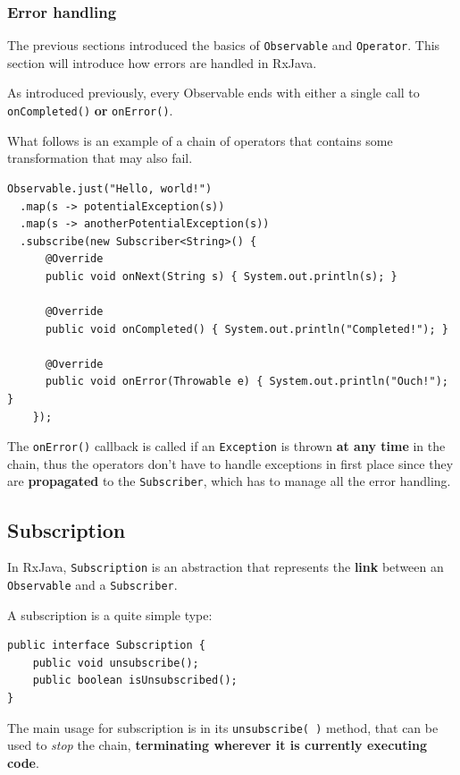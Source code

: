 \subsubsection{Error handling}\label{error-handling}

The previous sections introduced the basics of \texttt{Observable} and
\texttt{Operator}. This section will introduce how errors are handled in
RxJava.

As introduced previously, every Observable ends with either a single
call to \texttt{onCompleted()} \textbf{or} \texttt{onError()}.

What follows is an example of a chain of operators that contains some
transformation that may also fail.

\begin{verbatim}
Observable.just("Hello, world!")
  .map(s -> potentialException(s))
  .map(s -> anotherPotentialException(s))
  .subscribe(new Subscriber<String>() {
      @Override
      public void onNext(String s) { System.out.println(s); }

      @Override
      public void onCompleted() { System.out.println("Completed!"); }

      @Override
      public void onError(Throwable e) { System.out.println("Ouch!"); }
    });
\end{verbatim}

The \texttt{onError()} callback is called if an \texttt{Exception} is
thrown \textbf{at any time} in the chain, thus the operators don't have
to handle exceptions in first place since they are \textbf{propagated}
to the \texttt{Subscriber}, which has to manage all the error handling.


\subsection{Subscription}\label{subscription}

In RxJava, \texttt{Subscription} is an abstraction that represents the
\textbf{link} between an \texttt{Observable} and a \texttt{Subscriber}.

A subscription is a quite simple type:

\begin{verbatim}
public interface Subscription {
    public void unsubscribe();
    public boolean isUnsubscribed();
}
\end{verbatim}

The main usage for subscription is in its \texttt{unsubscribe(\ )}
method, that can be used to \emph{stop} the chain, \textbf{terminating
wherever it is currently executing code}.

